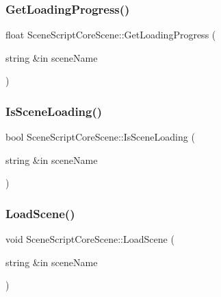 \hypertarget{class_scene_script_core_scene_a47b07594325ac14af21f21ddc8c3edaa}{}\label{class_scene_script_core_scene_a47b07594325ac14af21f21ddc8c3edaa} 
\subsubsection{\texorpdfstring{Get\+Loading\+Progress()}{GetLoadingProgress()}}
{\footnotesize\ttfamily float Scene\+Script\+Core\+Scene\+::\+Get\+Loading\+Progress (\begin{DoxyParamCaption}\item[{string \&in}]{scene\+Name }\end{DoxyParamCaption})}

\hypertarget{class_scene_script_core_scene_a167e7b752282eb353a4267b2576f45c2}{}\label{class_scene_script_core_scene_a167e7b752282eb353a4267b2576f45c2} 
\subsubsection{\texorpdfstring{Is\+Scene\+Loading()}{IsSceneLoading()}}
{\footnotesize\ttfamily bool Scene\+Script\+Core\+Scene\+::\+Is\+Scene\+Loading (\begin{DoxyParamCaption}\item[{string \&in}]{scene\+Name }\end{DoxyParamCaption})}

\hypertarget{class_scene_script_core_scene_a8d48c4f916876346116bf5e49f827da8}{}\label{class_scene_script_core_scene_a8d48c4f916876346116bf5e49f827da8} 
\subsubsection{\texorpdfstring{Load\+Scene()}{LoadScene()}}
{\footnotesize\ttfamily void Scene\+Script\+Core\+Scene\+::\+Load\+Scene (\begin{DoxyParamCaption}\item[{string \&in}]{scene\+Name }\end{DoxyParamCaption})}

